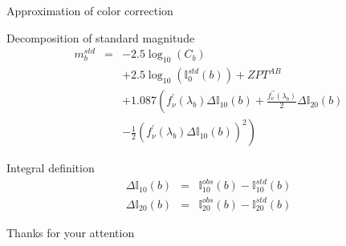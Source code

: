 \documentclass{beamer}
\begin{document}
\begin{frame}{Approximation of color correction}
\begin{alertblock}{Decomposition of standard magnitude}
\begin{eqnarray}
m_b^{std} & = & -2.5 \log_{10}(C_b)  \nonumber \\
          &   &  + 2.5 \log_{10}(\mathbb{I}_0^{std}(b)) + ZPT^{AB}  \nonumber \\
          &   &  + 1.087\left( f_\nu^\prime(\lambda_b) \Delta \mathbb{I}_{10}(b) +
          \frac{f_\nu^{\prime\prime}(\lambda_b)}{2}\Delta \mathbb{I}_{20}(b) \right. \nonumber \\
         & & - \left. \frac{1}{2}\left( f_\nu^\prime(\lambda_b) \Delta \mathbb{I}_{10}(b) \right)^2             
          \right)
\end{eqnarray}
\end{alertblock}
\begin{block}{Integral definition}
\begin{eqnarray}
\Delta \mathbb{I}_{10}(b) & = &  \mathbb{I}_{10}^{obs}(b)  -  \mathbb{I}_{10}^{std}(b) \\
\Delta \mathbb{I}_{20}(b) & = &   \mathbb{I}_{20}^{obs}(b)  -  \mathbb{I}_{20}^{std}(b) 
\end{eqnarray}
\end{block}
\end{frame}


\begin{frame}
\begin{center}
{

\LARGE \alert{Thanks for your attention}}

\end{center}

\end{frame}


 
\end{document}
